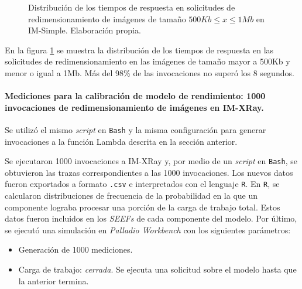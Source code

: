 \begin{figure}[h]
\hspace{-1.0cm}
\caption[Distribución de los tiempos de respuesta en solicitudes de redimensionamiento de imágenes de tamaño $500Kb \leq x \leq 1Mb$ en IM-Simple]{Distribución de los tiempos de respuesta en solicitudes de redimensionamiento de imágenes de tamaño $500Kb \leq x \leq 1Mb$ en IM-Simple. Elaboración propia.}
\label{fig:distribucion-solicitudes-imagenes-hasta-1mb}
\end{figure}


En la figura \ref{fig:distribucion-solicitudes-imagenes-hasta-1mb} se muestra la distribución de los tiempos de respuesta en las solicitudes de redimensionamiento en las imágenes de tamaño mayor a 500Kb y menor o igual a 1Mb. Más del 98\% de las invocaciones no superó los 8 segundos.

\paragraph{Mediciones para la calibración de modelo de rendimiento: 1000 invocaciones de redimensionamiento de imágenes en IM-XRay.} Se utilizó el mismo \emph{script} en \texttt{Bash} y la misma configuración para generar invocaciones a la función Lambda descrita en la sección anterior.

Se ejecutaron 1000 invocaciones a IM-XRay y, por medio de un \emph{script} en \texttt{Bash}, se obtuvieron las trazas correspondientes a las 1000 invocaciones. Los nuevos datos fueron exportados a formato \texttt{.csv} e interpretados con el lenguaje \texttt{R}. En \texttt{R}, se calcularon distribuciones de frecuencia de la probabilidad en la que un componente lograba procesar una porción de la carga de trabajo total. Estos datos fueron incluidos en los \emph{SEEFs} de cada componente del modelo. Por último, se ejecutó una simulación en \emph{Palladio Workbench} con los siguientes parámetros:
\begin{itemize}
    \item Generación de 1000 mediciones.
    \item Carga de trabajo: \emph{cerrada}. Se ejecuta una solicitud sobre el modelo hasta que la anterior termina. 
\end{itemize}

